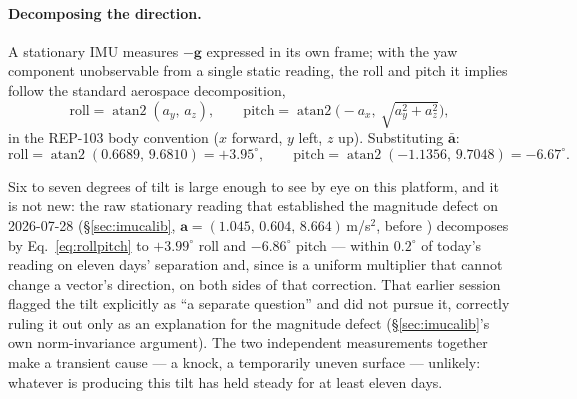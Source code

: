 \paragraph{Decomposing the direction.} A stationary IMU measures $-\mathbf{g}$
expressed in its own frame; with the yaw component unobservable from a single
static reading, the roll and pitch it implies follow the standard
aerospace decomposition,
\begin{equation}
\text{roll} = \operatorname{atan2}(a_y,\,a_z), \qquad
\text{pitch} = \operatorname{atan2}\!\bigl(-a_x,\ \sqrt{a_y^2+a_z^2}\bigr),
\label{eq:rollpitch}
\end{equation}
in the REP-103 body convention ($x$ forward, $y$ left, $z$ up). Substituting
$\bar{\mathbf{a}}$:
\begin{equation}
\text{roll} = \operatorname{atan2}(0.6689,\,9.6810) = +3.95^\circ, \qquad
\text{pitch} = \operatorname{atan2}(-1.1356,\,9.7048) = -6.67^\circ .
\label{eq:rollpitchval}
\end{equation}
\begin{center}
\end{center}
Six to seven degrees of tilt is large enough to see by eye on this platform,
and it is not new: the raw stationary reading that established the magnitude
defect on 2026-07-28 (\S\ref{sec:imucalib}, $\mathbf{a}=(1.045,\,0.604,\,
8.664)$\,m/s$^2$, before ) decomposes by
Eq.~\ref{eq:rollpitch} to $+3.99^\circ$ roll and $-6.86^\circ$ pitch ---
within $0.2^\circ$ of today's reading on eleven days' separation and, since
 is a uniform multiplier that cannot change a vector's
direction, on both sides of that correction. That earlier session flagged
the tilt explicitly as ``a separate question'' and did not pursue it,
correctly ruling it out only as an explanation for the magnitude defect
(\S\ref{sec:imucalib}'s own norm-invariance argument). The two independent
measurements together make a transient cause --- a knock, a temporarily
uneven surface --- unlikely: whatever is producing this tilt has held
steady for at least eleven days.


